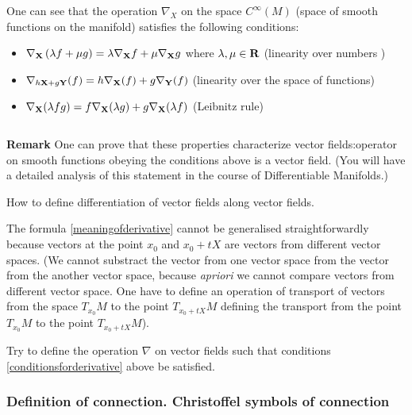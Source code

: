 \documentclass[12pt]{article}
\theoremstyle{theorem}
\numberwithin{equation}{section}
\begin{document}
One can see that the operation $\nabla_X$ on the 
space $C^\infty(M)$ (space of smooth functions on the manifold)
 satisfies the following conditions:
\begin{itemize}
\item
   $\nabla_{{\bf X}}\left(\lambda f+\mu g\right)=
   \lambda\nabla_{{\bf X}}f+\mu\nabla_{{\bf X}}g$
 where $\lambda,\mu\in {\bf R}$ (linearity over numbers )

\item
 $\nabla_{h{\bf X}+g\bf Y}(f)=h\nabla_{{\bf X}}(f)+g\nabla_{\bf Y}(f)$
                   (linearity over the space of functions)


\item

  $\nabla_{\bf X}(\lambda fg)=f\nabla_{\bf X}(\lambda g)+g\nabla_{\bf X}(\lambda f)$                       (Leibnitz rule)

\begin{equation}\label{conditionsforderivative}
\end{equation}

\end{itemize}

{\bf Remark}
One can prove that these properties characterize  vector fields:operator on smooth functions
obeying the conditions above is a vector field.
(You will have a detailed analysis of this statement in the course of Differentiable Manifolds.)

\m

How to define differentiation of vector fields along vector fields.

The formula \eqref{meaningofderivative} cannot be generalised straightforwardly because
vectors at the point $x_0$ and $x_0+t X$ are vectors from different vector spaces.
(We cannot substract the vector from one vector space from the
vector from the another vector space, because {\it apriori}
we cannot compare vectors from different vector space.
One have to define an operation of transport of vectors from the space
$T_{x_0}M$ to the point $T_{x_0+tX}M$ defining the transport
from the point $T_{x_0}M$ to the point $T_{x_0+tX}M$).

Try to define the operation $\nabla$ on vector fields such
that conditions \eqref{conditionsforderivative} above  be satisfied.



\subsubsection{Definition of connection. Christoffel symbols of connection}
\label{definitionofconnection}
\end{document}
